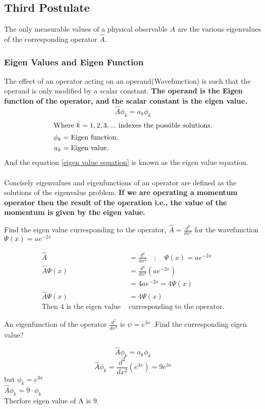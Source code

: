 \subsection{Third Postulate}
The only measurable values of a physical observable ${A}$ are the various eigenvalues of the corresponding operator $\hat{{A}}$.
\subsubsection{Eigen Values and Eigen Function}
The effect of an operator acting on an operand(Wavefunction) is such that the operand is only modified by a scalar constant.\textbf{ The operand is the Eigen function of the operator,  and the scalar constant is the eigen value.}
\begin{equation}
\hat{A} \phi_{k}=a_{k}\phi_{k} 
\label{eigen value equation}
\end{equation}
\begin{align*}
\intertext{Where $ k = 1, 2,3, . . . $ indexes the possible solutions.}
\phi_{k}&=\text{Eigen function.}\\
a_{k}&=\text{Eigen value.}
\end{align*}
And the equation \ref{eigen value equation} is known as the eigen value equation.\\\\
Concisely eigenvalues and eigenfunctions of an operator are defined as the solutions of the eigenvalue problem.
\textbf{If we are operating a momentum operator then the result of the operation i.e., the value of the momentum is given by the eigen value.}
\begin{exercise}
	Find the eigen value curresponding to the operator, $\hat{A}=\frac{d^{2}}{d x^{2}}$ for the wavefunction $\Psi(x)=a e^{-2 x}$
\end{exercise}
\begin{answer}
	\begin{align*}
	\hat{A}&=\frac{d^{2}}{d x^{2}} \quad;\quad  \Psi(x)=a e^{-2 x}\\
	\hat{A} \Psi(x)&=\frac{d^{2}}{d x^{2}}\left(a e^{-2 x}\right)\\
	&=4 a e^{-2 x}=4 \Psi(x)\\
	\hat{A} \Psi(x)&=4 \Psi(x)\\
	\text{Then 4 is the eigen value }&\text{curresponding to the operator.}
	\end{align*}	
\end{answer}
\begin{exercise}
	An eigenfunction of the operator $\frac{d^2}{dx^2}$ is $\psi=e^{3x}$ .Find the curresponding eigen value?
\end{exercise}
\begin{answer}
$$\hat{{A}}\phi_{k}=a_k\phi_{k}$$
$$\hat{A}\phi_{k}=\frac{d^2}{dx^2}(e^{3x})=9e^{3x}$$
but $\phi_{k}=e^{3x}$\\
$\hat{A}\phi_{k}=9\cdot \phi_{k}$\\
Therfore eigen value of A is 9.	
\end{answer}
